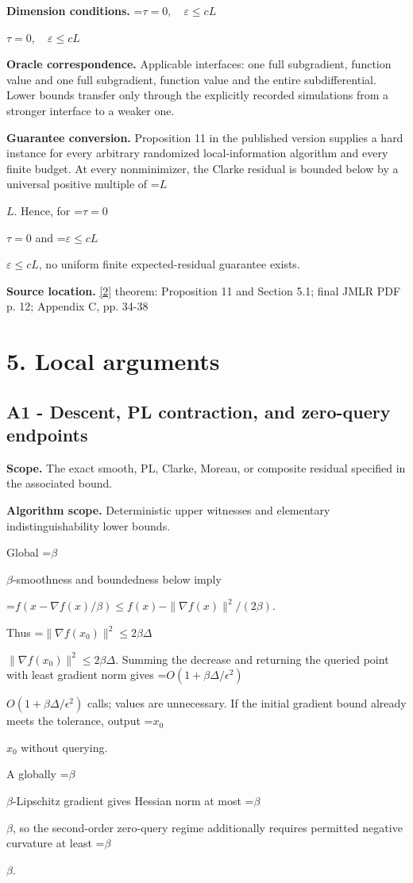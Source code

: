 \documentclass[10pt,a4paper]{article}
\newcommand{\AtlasMath}[1]{\par\begingroup\centering\setbox0=\hbox{$\displaystyle #1$}\ifdim\wd0>1.4\linewidth\typeout{ATLAS WIDE FORMULA: \the\wd0}\fi\ifdim\wd0>\linewidth\resizebox{\linewidth}{!}{\box0}\else\box0\fi\par\endgroup}
\newcommand{\AtlasInlineMath}[1]{\begingroup\setbox0=\hbox{$#1$}\ifdim\wd0>.4\linewidth\endgroup\AtlasMath{#1}\else\endgroup$#1$\fi}
\begin{document}
\textbf{Dimension conditions.} \AtlasInlineMath{\tau=0,\quad\varepsilon\le cL}

\textbf{Oracle correspondence.} Applicable interfaces: one full subgradient, function value and one full subgradient, function value and the entire subdifferential. Lower bounds transfer only through the explicitly recorded simulations from a stronger interface to a weaker one.

\textbf{Guarantee conversion.} Proposition 11 in the published version supplies a hard instance for every arbitrary randomized local-information algorithm and every finite budget. At every nonminimizer, the Clarke residual is bounded below by a universal positive multiple of \AtlasInlineMath{L}. Hence, for \AtlasInlineMath{\tau=0} and \AtlasInlineMath{\varepsilon\le cL}, no uniform finite expected-residual guarantee exists.

\textbf{Source location.} \href{https://www.jmlr.org/papers/volume23/21-1507/21-1507.pdf}{[2]} theorem: Proposition 11 and Section 5.1; final JMLR PDF p. 12; Appendix C, pp. 34-38

\section{5. Local arguments}
\subsection{A1 - Descent, PL contraction, and zero-query endpoints}
\textbf{Scope.} The exact smooth, PL, Clarke, Moreau, or composite residual specified in the associated bound.

\textbf{Algorithm scope.} Deterministic upper witnesses and elementary indistinguishability lower bounds.

Global \AtlasInlineMath{\beta}-smoothness and boundedness below imply

\AtlasMath{f(x-\nabla f(x)/\beta)\le f(x)-\|\nabla f(x)\|^2/(2\beta).}

Thus \AtlasInlineMath{\|\nabla f(x_0)\|^2\le2\beta\Delta}. Summing the decrease and returning the queried point with least gradient norm gives \AtlasInlineMath{O(1+\beta\Delta/\epsilon^2)} calls; values are unnecessary. If the initial gradient bound already meets the tolerance, output \AtlasInlineMath{x_0} without querying.

A globally \AtlasInlineMath{\beta}-Lipschitz gradient gives Hessian norm at most \AtlasInlineMath{\beta}, so the second-order zero-query regime additionally requires permitted negative curvature at least \AtlasInlineMath{\beta}.
\end{document}
